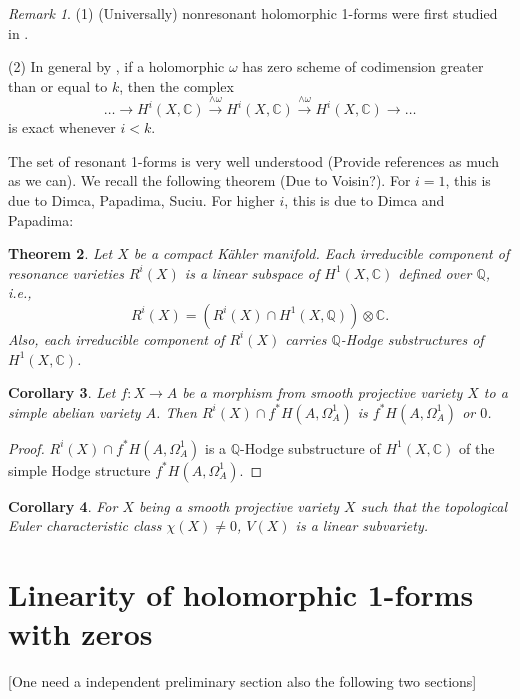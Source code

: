 \documentclass[a4paper,12pt,reqno]{amsart}
\newtheorem{theorem}{Theorem}[section]
\theoremstyle{plain}
\newtheorem{corollary}[theorem]{Corollary}
\theoremstyle{remark}
\newtheorem{remark}[theorem]{Remark}
\newcommand{\Q}{\mathbb Q}
\newcommand{\C}{\mathbb C}
\begin{document}
\begin{remark}

(1) (Universally) nonresonant  holomorphic 1-forms were first studied in \cite{SS19}.

(2) In general by \cite[Proposition 3.4]{GL87}, if a holomorphic $\omega$ has zero scheme of codimension greater than or equal to $k$, then the complex $$\ldots\to H^{i}(X,\C)\overset{\wedge\omega}{\rightarrow}H^{i}(X,\C)\overset{\wedge\omega}{\rightarrow}H^{i}(X,\C)\to\ldots$$ is exact whenever $i<k.$ 
\end{remark}

The set of resonant 1-forms is very well understood {\color{red} (Provide references as much as we can)}. We recall the following theorem {\color{red} (Due to Voisin?)}. For $i=1$, this is due to Dimca, Papadima, Suciu. For higher $i$, this is due to Dimca and Papadima:

\begin{theorem}{\cite[Theorem C, Corollary 1.7]{DiPa13}}\label{thm: resonant}
Let $X$ be a compact K\"ahler manifold. Each irreducible component of resonance varieties $R^i(X)$ is a linear subspace of $H^1(X, \C)$ defined over $\Q$, i.e., $$R^i(X)=(R^i(X)\cap H^1(X, \Q))\otimes\C.$$ Also,  each irreducible component of $R^i(X)$ carries $\Q$-Hodge substructures of $H^1(X, \C)$.
\end{theorem} 

\begin{corollary}
Let $f:X\to A$ be a morphism from smooth projective variety $X$ to a simple abelian  variety $A$. Then $R^i(X)\cap f^*H(A, \Omega_A^1)$ is $f^*H(A, \Omega_A^1)$ or $0$.
\end{corollary}

\begin{proof}
$R^i(X)\cap f^*H(A, \Omega_A^1)$ is a $\Q$-Hodge substructure of $H^1(X, \C)$ of the simple Hodge structure $f^*H(A, \Omega_A^1)$.
\end{proof}

\begin{corollary}\label{ECNT}
For $X$ being a smooth projective variety $X$ such that the topological Euler characteristic class $\chi(X)\not=0$, $V(X)$ is a linear subvariety.
\end{corollary}


\section{Linearity of holomorphic 1-forms with zeros} [{\color{red}One need a independent preliminary section also the following two sections}]
%
\end{document}
